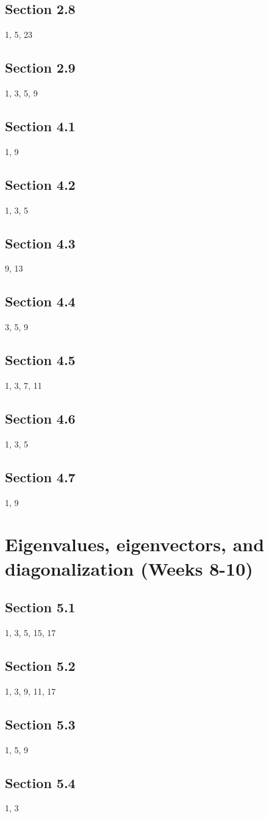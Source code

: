 \documentclass{amsart}
\begin{document}
\subsection*{Section 2.8} 1, 5, 23
\subsection*{Section 2.9} 1, 3, 5, 9
\subsection*{Section 4.1} 1, 9
\subsection*{Section 4.2} 1, 3, 5
\subsection*{Section 4.3} 9, 13
\subsection*{Section 4.4} 3, 5, 9
\subsection*{Section 4.5} 1, 3, 7, 11
\subsection*{Section 4.6} 1, 3, 5
\subsection*{Section 4.7} 1, 9


\section{Eigenvalues, eigenvectors, and diagonalization (Weeks 8-10)}

\subsection*{Section 5.1} 1, 3, 5, 15, 17
\subsection*{Section 5.2} 1, 3, 9, 11, 17
\subsection*{Section 5.3} 1, 5, 9
\subsection*{Section 5.4} 1, 3
\end{document}
